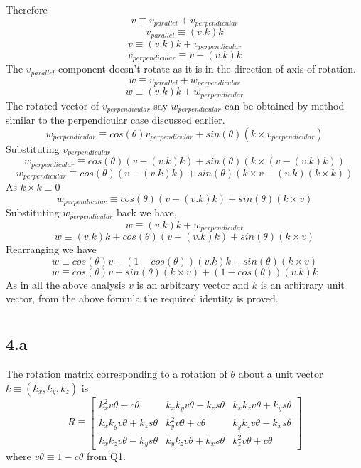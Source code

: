 \documentclass[12pt]{article}
\begin{document}
Therefore
\[
  v \equiv v_{parallel} + v_{perpendicular}
\]
\[
  v_{parallel} \equiv (v . k) k
\]
\[
  v \equiv (v . k) k + v_{perpendicular}
\]
\[
  v_{perpendicular} \equiv v - (v . k) k
\]
The $v_{parallel}$ component doesn't rotate as it is in the direction of axis of rotation.
\[
  w \equiv v_{parallel} + w_{perpendicular}
\]
\[
  w \equiv (v . k) k + w_{perpendicular}
\]
The rotated vector of $v_{perpendicular}$ say $w_{perpendicular}$ can be obtained by method similar to the perpendicular case discussed earlier.
\[
  w_{perpendicular} \equiv cos(\theta) v_{perpendicular} + sin(\theta) (k \times v_{perpendicular})
\]
Substituting $v_{perpendicular}$
\[
  w_{perpendicular} \equiv cos(\theta) (v - (v . k) k) + sin(\theta) (k \times (v - (v . k) k))
\]
\[
  w_{perpendicular} \equiv cos(\theta) (v - (v . k) k) + sin(\theta) (k \times v - (v . k) (k \times k))
\]
As $k \times k \equiv 0$
\[
  w_{perpendicular} \equiv cos(\theta) (v - (v . k) k) + sin(\theta) (k \times v)
\]
Substituting $w_{perpendicular}$ back we have,
\[
  w \equiv (v . k) k + w_{perpendicular}
\]
\[
  w \equiv (v . k) k + cos(\theta) (v - (v . k) k) + sin(\theta) (k \times v)
\]
Rearranging we have
\[
  w \equiv cos(\theta) v + (1 - cos(\theta)) (v . k) k + sin(\theta) (k \times v)
\]
\[
  w \equiv cos(\theta) v + sin(\theta) (k \times v) + (1 - cos(\theta)) (v . k) k
\]
As in all the above analysis $v$ is an arbitrary vector and $k$ is an arbitrary unit vector, from the above formula the required identity is proved.

\pagebreak

\section{}
\subsection*{4.a}
The rotation matrix corresponding to a rotation of $\theta$ about a unit vector $ k \equiv (k_x, k_y, k_z)$ is
\[
  R \equiv
  \begin{bmatrix}
    k_x^2v\theta + c\theta & k_xk_yv\theta - k_zs\theta & k_xk_zv\theta + k_ys\theta\\
    k_xk_yv\theta + k_zs\theta & k_y^2v\theta + c\theta & k_yk_zv\theta - k_xs\theta \\
    k_xk_zv\theta - k_ys\theta & k_yk_zv\theta + k_xs\theta & k_z^2v\theta + c\theta
  \end{bmatrix}
\]
where $v\theta \equiv 1 - c\theta$ from Q1.
\end{document}
